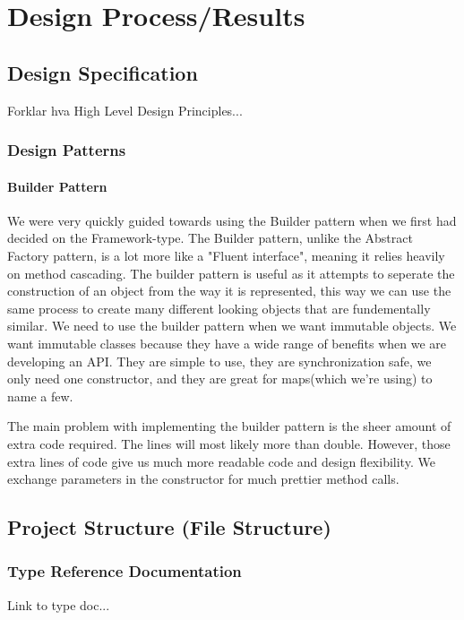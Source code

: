 \documentclass[12pt]{article}
\begin{document}
\section{Design Process/Results}

    \subsection{Design Specification}
    Forklar hva High Level Design Principles...

        \subsubsection{Design Patterns}

        \paragraph{Builder Pattern}
        We were very quickly guided towards using the Builder pattern when we first had decided on the Framework-type. The Builder pattern, unlike the Abstract Factory pattern, is a lot more like a "Fluent interface", meaning it relies heavily on method cascading.
        The builder pattern is useful as it attempts to seperate the construction of an object from the way it is represented, this way we can use the same process to create many different looking objects that are fundementally similar.
        We need to use the builder pattern when we want immutable objects. We want immutable classes because they have a wide range of benefits when we are developing an API. They are simple to use, they are synchronization safe, we only need one constructor, and they are great for maps(which we're using) to name a few.

        The main problem with implementing the builder pattern is the sheer amount of extra code required. The lines will most likely more than double. However, those extra lines of code give us much more readable code and design flexibility. We exchange parameters in the constructor for much prettier method calls.

    \subsection{Project Structure (File Structure)}

        \subsubsection{Type Reference Documentation}
        Link to type doc...
\end{document}
